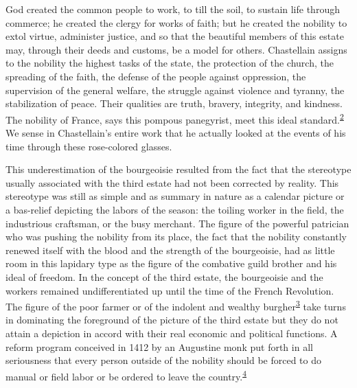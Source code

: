 God created the common people to work, to till the soil, to sustain life
through commerce; he created the clergy for works of faith; but he
created the nobility to extol virtue, administer justice, and so that
the beautiful members of this estate may, through their deeds and
customs, be a model for others. Chastellain assigns to the nobility the
highest tasks of the state, the protection of the church, the spreading
of the faith, the defense of the people against oppression, the
supervision of the general welfare, the struggle against violence and
tyranny, the stabilization of peace. Their qualities are truth, bravery,
integrity, and kindness. The nobility of France, says this pompous
panegyrist, meet this ideal
standard.\textsuperscript{\protect\hypertarget{10_Chapter_Three__THE_HEROIC_DREAM.xhtmlux5cux23id_1927}{\protect\hyperlink{23_NOTES.xhtmlux5cux23id_1928}{2}}}
We sense in Chastellain's entire work that he actually looked at the
events of his time through these rose-colored glasses.

This underestimation of the bourgeoisie resulted from the fact that the
stereotype usually associated with the third estate had not been
corrected by reality. This stereotype was still as simple and as summary
in nature as a calendar picture or a bas-relief depicting the labors of
the season: the toiling worker in the field, the industrious craftsman,
or the busy merchant. The figure of the powerful patrician who was
pushing the nobility from its place, the fact that the nobility
constantly renewed itself with the blood and the strength of the
bourgeoisie, had as little room in this lapidary type as the figure of
the combative guild brother and his ideal of
free\protect\hypertarget{10_Chapter_Three__THE_HEROIC_DREAM.xhtmlux5cux23page_64}{}{}dom.
In the concept of the third estate, the bourgeoisie and the workers
remained undifferentiated up until the time of the French Revolution.
The figure of the poor farmer or of the indolent and wealthy
burgher\textsuperscript{\protect\hypertarget{10_Chapter_Three__THE_HEROIC_DREAM.xhtmlux5cux23id_1925}{\protect\hyperlink{23_NOTES.xhtmlux5cux23id_1926}{3}}}
take turns in dominating the foreground of the picture of the third
estate but they do not attain a depiction in accord with their real
economic and political functions. A reform program conceived in 1412 by
an Augustine monk put forth in all seriousness that every person outside
of the nobility should be forced to do manual or field labor or be
ordered to leave the
country.\textsuperscript{\protect\hypertarget{10_Chapter_Three__THE_HEROIC_DREAM.xhtmlux5cux23id_1923}{\protect\hyperlink{23_NOTES.xhtmlux5cux23id_1924}{4}}}


